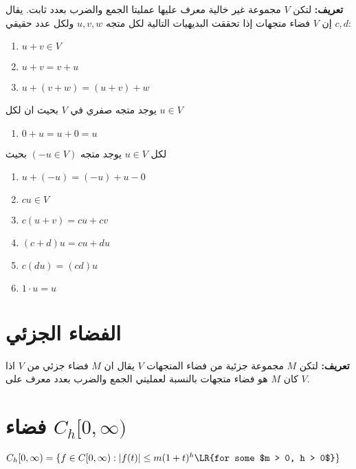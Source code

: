 	\textbf{تعريف:}  
	لتكن \( V \) مجموعة غير خالية معرف عليها عمليتا الجمع والضرب بعدد ثابت. يقال إن \( V \) فضاء متجهات إذا تحققت البديهيات التالية لكل متجه \( u, v, w \) ولكل عدد حقيقي \( c, d \):
\begin{english}
		\begin{enumerate}[label=\arabic*)]
		\item \( u + v \in V \)
		\item \( u + v = v + u \)
		\item \( u + (v + w) = (u + v) + w \)
	\end{enumerate}
	\end{english}
	يوجد متجه صفري في $V$ بحيث ان لكل $u\in V$
	\begin{english}
		\begin{enumerate}[label=\arabic*), start=4]
			\item \(0 + u = u + 0 = u\)
		\end{enumerate}
	\end{english}
	لكل $u \in V$ يوجد متجه $(-u \in V)$ بحيث
	\begin{english}
		\begin{enumerate}[label=\arabic*), start=5]
\item $u + (-u) = (-u) + u - 0$
		\item \( c u \in V \)
		\item \( c (u + v) = cu + cv \)
		\item \( (c + d) u = cu + du \)
		\item \( c (d u) = (cd) u \)
		\item \( 1 \cdot u = u \)
	\end{enumerate}
\end{english}
	
	\section{الفضاء الجزئي }
		\textbf{تعريف:} لتكن $M$ مجموعة جزئية من فضاء المتجهات $V$ يقال ان $M$ فضاء جزئي من $V$ اذا كان $M$  هو فضاء متجهات بالنسبة لعمليتي الجمع والضرب بعدد معرف على $V$.
	\section{فضاء $C_h[0, \infty)$}
	\begin{center}
		$C_h[0, \infty) = \{f\in C[0, \infty) : |f(t)| \leq m(1+t)^h \text{\LR{for some $m > 0, h > 0$}}\}$
	\end{center}
	

